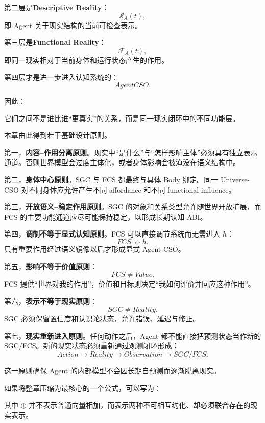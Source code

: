 第二层是\textbf{Descriptive Reality}：
\[
\mathcal S_A(t),
\]
即 Agent 关于现实结构的当前可检查表示。

第三层是\textbf{Functional Reality}：
\[
\mathcal F_A(t),
\]
即同一现实相对于当前身体和运行状态产生的作用。

第四层才是进一步进入认知系统的：
\[
AgentCSO.
\]

因此：
\begin{statementbox}
\centering
{}
\end{statementbox}

它们之间不是谁比谁“更真实”的关系，而是同一现实闭环中的不同功能层。

本章由此得到若干基础设计原则。

第一，\textbf{内容--作用分离原则}。现实中“是什么”与“怎样影响主体”必须具有独立表示通道。否则世界模型会过度主体化，或者身体影响会被淹没在语义结构中。

第二，\textbf{身体中心原则}。SGC 与 FCS 都最终与具体 Body 绑定。同一 Universe-CSO 对不同身体应允许产生不同 affordance 和不同 functional influence。

第三，\textbf{开放语义--稳定作用原则}。SGC 的对象和关系类型允许随世界开放扩展，而 FCS 的主要功能通道应尽可能保持稳定，以形成长期认知 ABI。

第四，\textbf{调制不等于显式认知原则}。FCS 可以直接调节系统而无需进入 $h$：
\[
FCS
\not\Rightarrow
h.
\]
只有重要作用经过语义镜像以后才形成显式 Agent-CSO。

第五，\textbf{影响不等于价值原则}：
\[
FCS\neq Value.
\]
FCS 提供“世界对我的作用”，价值和目标则决定“我如何评价并回应这种作用”。

第六，\textbf{表示不等于现实原则}：
\[
SGC\neq Reality.
\]
SGC 必须保留置信度和认识论状态，允许错误、延迟与修正。

第七，\textbf{现实重新进入原则}。任何动作之后，Agent 都不能直接把预测状态当作新的 SGC/FCS。新的现实状态必须重新通过观测闭环形成：
\[
Action
\rightarrow
Reality
\rightarrow
Observation
\rightarrow
SGC/FCS.
\]

这一原则确保 Agent 的内部模型不会因长期自预测而逐渐脱离现实。

如果将整章压缩为最核心的一个公式，可以写为：
\begin{statementbox}
\centering
{}
\end{statementbox}
其中 $\oplus$ 并不表示普通向量相加，而表示两种不可相互约化、却必须联合存在的现实表示。

